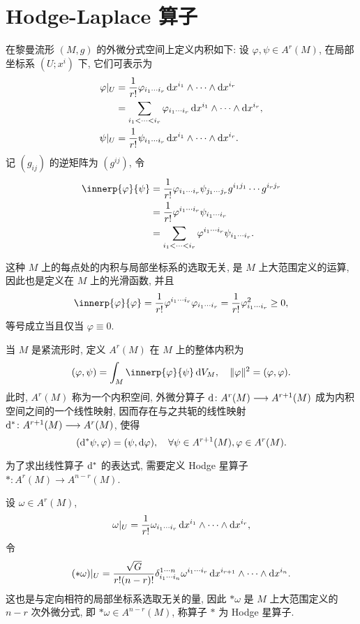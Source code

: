 \section{Hodge-Laplace 算子}



在黎曼流形 $(M,g)$ 的外微分式空间上定义内积如下:
设 $\varphi,\psi\in A^r(M)$, 在局部坐标系 $(U;x^i)$ 下, 它们可表示为
\begin{align*}
  \varphi|_U & = \frac{1}{r!}\varphi_{i_1\cdots i_r}\mathop{}\!\mathrm{d} x^{i_1}\wedge\cdots\wedge\mathop{}\!\mathrm{d} x^{i_r} \\
             & = \sum_{i_1<\cdots<i_r}\varphi_{i_1\cdots i_r}\mathop{}\!\mathrm{d} x^{i_1}\wedge\cdots\wedge
                \mathop{}\!\mathrm{d} x^{i_r}, \\
  \psi|_U    & = \frac{1}{r!}\psi_{i_1\cdots i_r}\mathop{}\!\mathrm{d} x^{i_1}\wedge\cdots\wedge\mathop{}\!\mathrm{d} x^{i_r}.
\end{align*}
记 $(g_{ij})$ 的逆矩阵为 $(g^{ij})$, 令
\begin{align*}
  \innerp{\varphi}{\psi}
  & = \frac{1}{r!}\varphi_{i_1\cdots i_r}\psi_{j_1\cdots j_r}g^{i_1j_1}\cdots g^{i_rj_r} \\
  & = \frac{1}{r!}\varphi^{i_1\cdots i_r}\psi_{i_1\cdots i_r} \\
  & = \sum_{i_1<\cdots<i_r}\varphi^{i_1\cdots i_r}\psi_{i_1\cdots i_r}.
\end{align*}

这种 $M$ 上的每点处的内积与局部坐标系的选取无关, 是 $M$ 上大范围定义的运算, 因此也是定义在 $M$
上的光滑函数, 并且
\[\innerp{\varphi}{\varphi} = \frac{1}{r!}\varphi^{i_1\cdots i_r}\varphi_{i_1\cdots i_r}
  = \frac{1}{r!}\varphi_{i_1\cdots i_r}^2\geq 0,\]
等号成立当且仅当 $\varphi\equiv 0$.

当 $M$ 是紧流形时, 定义 $A^r(M)$ 在 $M$ 上的整体内积为
\[(\varphi,\psi) = \int_M \innerp{\varphi}{\psi}\diff V_M,\quad 
  \|\varphi\|^2=(\varphi,\varphi).\]
此时, $A^r(M)$ 称为一个内积空间,
外微分算子 $\mathop{}\!\mathrm{d}\colon A^r(M)\longrightarrow A^{r+1}(M)$ 成为内积空间之间的一个线性映射,
因而存在与之共轭的线性映射 $\mathop{}\!\mathrm{d}^*\colon A^{r+1}(M)\longrightarrow A^r(M)$, 使得
\[(\mathop{}\!\mathrm{d}^*\psi,\varphi) = (\psi,\mathop{}\!\mathrm{d}\varphi),\quad \forall\psi\in A^{r+1}(M),\varphi\in A^r(M).\]

为了求出线性算子 $\mathop{}\!\mathrm{d} ^*$ 的表达式, 需要定义 Hodge 星算子 $*\colon A^r(M)\to A^{n-r}(M)$.
\begin{definition}
  设 $\omega\in A^r(M)$,
  \[\omega|_U = \frac{1}{r!}\omega_{i_1\cdots i_r}\mathop{}\!\mathrm{d} x^{i_1}\wedge\cdots\wedge\mathop{}\!\mathrm{d} x^{i_r},\]
  令
  \[(*\omega)|_U = \frac{\sqrt{G}}{r!(n-r)!}\delta_{i_1\cdots i_n}^{1\cdots n}
    \omega^{i_1\cdots i_r}\mathop{}\!\mathrm{d} x^{i_{r+1}}\wedge\cdots\wedge\mathop{}\!\mathrm{d} x^{i_n}.\]
  这也是与定向相符的局部坐标系选取无关的量, 因此 $*\omega$ 是 $M$ 上大范围定义的 $n-r$
  次外微分式, 即 $*\omega\in A^{n-r}(M)$, 称算子 $*$ 为 Hodge 星算子.
\end{definition}

